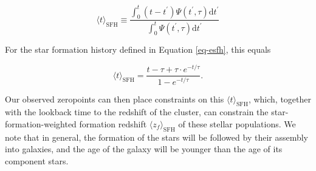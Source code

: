 \begin{equation}\label{eq-tsfh}
\langle t \rangle_\mathrm{SFH} \equiv \frac{\int_0^t(t-t^\prime)\Psi(t^\prime,\tau)\mathrm{d}t^\prime}
{\int_0^t\Psi(t^\prime,\tau)\mathrm{d}t^\prime}
\end{equation}

For the star formation history defined in Equation \ref{eq-esfh}, this equals

\begin{equation}\label{eq-etsfh}
\langle t \rangle_\mathrm{SFH} = \frac{t - \tau + \tau\cdot e^{-t/\tau}}{1-e^{-t/\tau}} .
\end{equation}

Our observed zeropoints can then place constraints on this $\langle t \rangle_\mathrm{SFH}$, which, together with the lookback time to the redshift of the cluster, can constrain the star-formation-weighted formation redshift $\langle z_f \rangle_\mathrm{SFH}$ of these stellar populations. We note that in general, the formation of the stars will be followed by their assembly into galaxies, and the age of the galaxy will be younger than the age of its component stars.

